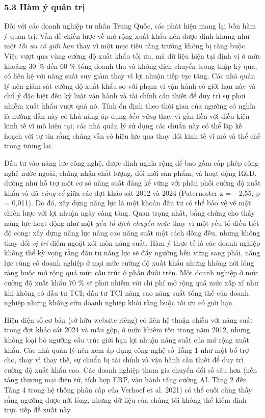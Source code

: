 \documentclass[12pt,a4paper]{article}
\begin{document}
\hypertarget{53-huxe0m-uxfd-quux1ea3n-trux1ecb}{%
\subsubsection{5.3 Hàm ý quản
trị}\label{53-huxe0m-uxfd-quux1ea3n-trux1ecb}}

Đối với các doanh nghiệp tư nhân Trung Quốc, các phát hiện mang lại bốn
hàm ý quản trị. Vấn đề chiến lược về mở rộng xuất khẩu nên được định
khung như một \emph{tối ưu có giới hạn} thay vì một mục tiêu tăng trưởng
không bị ràng buộc. Việc vượt qua vùng cường độ xuất khẩu tối ưu, mà dữ
liệu hiện tại định vị ở mức khoảng 30 \% đến 60 \% tổng doanh thu và
không dịch chuyển trong thập kỷ qua, có liên hệ với năng suất suy giảm
thay vì lợi nhuận tiếp tục tăng. Các nhà quản lý nên giám sát cường độ
xuất khẩu so với phạm vi vận hành có giới hạn này và chú ý đặc biệt đến
kỷ luật vận hành và tài chính cần thiết để duy trì sự phơi nhiễm xuất
khẩu vượt quá nó. Tính ổn định theo thời gian của ngưỡng có nghĩa là
hướng dẫn này có khả năng áp dụng \emph{bền vững} thay vì gắn liền với
điều kiện kinh tế vĩ mô hiện tại; các nhà quản lý sử dụng các chuẩn này
có thể lập kế hoạch với tự tin rằng chúng vẫn có hiệu lực qua thay đổi
kinh tế vĩ mô và thể chế trong tương lai.

Đầu tư vào năng lực công nghệ, được định nghĩa rộng để bao gồm cấp phép
công nghệ nước ngoài, chứng nhận chất lượng, đổi mới sản phẩm, và hoạt
động R\&D, dường như hỗ trợ một cơ sở năng suất đáng kể vững với phân
phối cường độ xuất khẩu và đã \emph{củng cố} giữa các đợt khảo sát 2012
và 2024 (Paternoster z = −2,55, p = 0,011). Do đó, xây dựng năng lực là
một khoản đầu tư có thể bảo vệ về mặt chiến lược với lợi nhuận ngày càng
tăng. Quan trọng nhất, bằng chứng cho thấy năng lực hoạt động như một
\emph{yếu tố dịch chuyển mức} thay vì một yếu tố điều tiết độ cong: xây
dựng năng lực nâng cao năng suất một cách đồng đều, nhưng không thay đổi
\emph{vị trí} điểm ngoặt xói mòn năng suất. Hàm ý thực tế là các doanh
nghiệp không thể kỳ vọng rằng đầu tư năng lực sẽ đẩy ngưỡng bền vững
sang phải, năng lực củng cố doanh nghiệp ở mọi mức cường độ xuất khẩu
nhưng không nới lỏng ràng buộc mở rộng quá mức cấu trúc ở phần đuôi
trên. Một doanh nghiệp ở mức cường độ xuất khẩu 70 \% sẽ phơi nhiễm với
chi phí mở rộng quá mức xấp xỉ như khi không có đầu tư TCI; đầu tư TCI
nâng cao năng suất tổng thể của doanh nghiệp nhưng không cứu doanh
nghiệp khỏi ràng buộc tối ưu có giới hạn.

Hiện diện số cơ bản (sở hữu website riêng) có liên hệ thuận chiều với
năng suất trong đợt khảo sát 2024 và mẫu gộp, ở mức khiêm tốn trong năm
2012, nhưng không loại bỏ ngưỡng cấu trúc giới hạn lợi nhuận năng suất
của mở rộng xuất khẩu. Các nhà quản lý nên xem áp dụng công nghệ số Tầng
1 như một bổ trợ cho, thay vì thay thế, sự chuẩn bị tài chính và vận
hành cần thiết để duy trì cường độ xuất khẩu cao. Các doanh nghiệp tham
gia chuyển đổi số sâu hơn (nền tảng thương mại điện tử, tích hợp ERP,
vận hành tăng cường AI. Tầng 2 đến Tầng 4 trong hệ thống phân cấp của
Verhoef et al. 2021) có thể cuối cùng thấy rằng ngưỡng được nới lỏng,
nhưng dữ liệu của chúng tôi không thể kiểm định trực tiếp đề xuất này.
\end{document}
